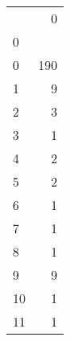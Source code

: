 \begin{tabular}{lr}
\toprule
   &    0 \\
0 &      \\
\midrule
0  &  190 \\
1  &    9 \\
2  &    3 \\
3  &    1 \\
4  &    2 \\
5  &    2 \\
6  &    1 \\
7  &    1 \\
8  &    1 \\
9  &    9 \\
10 &    1 \\
11 &    1 \\
\bottomrule
\end{tabular}

